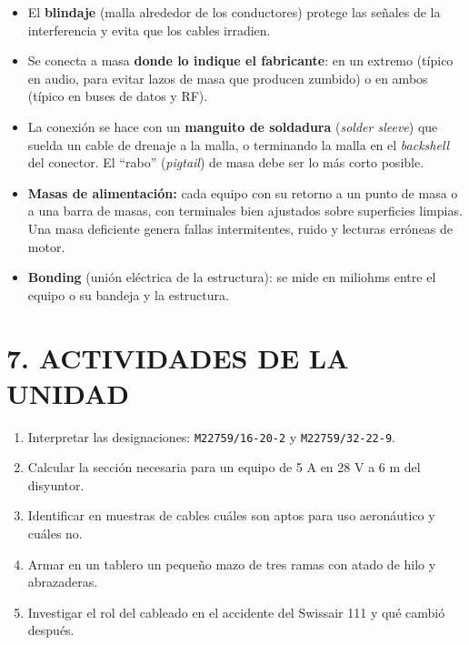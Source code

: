 \begin{itemize}
  \item El \textbf{blindaje} (malla alrededor de los conductores) protege las señales de la
        interferencia y evita que los cables irradien.
  \item Se conecta a masa \textbf{donde lo indique el fabricante}: en un extremo (típico en audio,
        para evitar lazos de masa que producen zumbido) o en ambos (típico en buses de datos y RF).
  \item La conexión se hace con un \textbf{manguito de soldadura} (\textit{solder sleeve}) que suelda
        un cable de drenaje a la malla, o terminando la malla en el \textit{backshell} del conector.
        El ``rabo'' (\textit{pigtail}) de masa debe ser lo más corto posible.
  \item \textbf{Masas de alimentación:} cada equipo con su retorno a un punto de masa o a una barra
        de masas, con terminales bien ajustados sobre superficies limpias. Una masa deficiente
        genera fallas intermitentes, ruido y lecturas erróneas de motor.
  \item \textbf{Bonding} (unión eléctrica de la estructura): se mide en miliohms entre el equipo o
        su bandeja y la estructura.
\end{itemize}

\section*{7. ACTIVIDADES DE LA UNIDAD}
\begin{enumerate}
  \item Interpretar las designaciones: \texttt{M22759/16-20-2} y \texttt{M22759/32-22-9}.
  \item Calcular la sección necesaria para un equipo de 5 A en 28 V a 6 m del disyuntor.
  \item Identificar en muestras de cables cuáles son aptos para uso aeronáutico y cuáles no.
  \item Armar en un tablero un pequeño mazo de tres ramas con atado de hilo y abrazaderas.
  \item Investigar el rol del cableado en el accidente del Swissair 111 y qué cambió después.
\end{enumerate}

